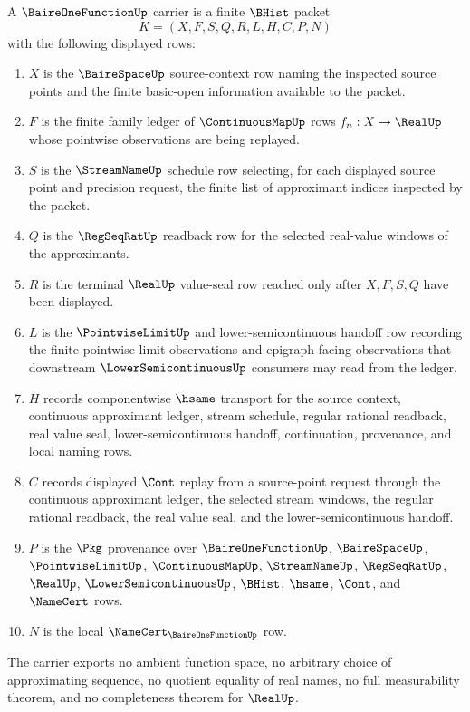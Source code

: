 \begin{definition}
\label{def:baireonefunction-carrier}
\label{def:baire-one-function-carrier}
A $\BaireOneFunctionUp$ carrier is a finite $\BHist$ packet
$$
K=(X,F,S,Q,R,L,H,C,P,N)
$$
with the following displayed rows:
\begin{enumerate}
\item $X$ is the $\BaireSpaceUp$ source-context row naming the inspected source points and the finite basic-open information available to the packet.
\item $F$ is the finite family ledger of $\ContinuousMapUp$ rows $f_n:X\to\RealUp$ whose pointwise observations are being replayed.
\item $S$ is the $\StreamNameUp$ schedule row selecting, for each displayed source point and precision request, the finite list of approximant indices inspected by the packet.
\item $Q$ is the $\RegSeqRatUp$ readback row for the selected real-value windows of the approximants.
\item $R$ is the terminal $\RealUp$ value-seal row reached only after $X,F,S,Q$ have been displayed.
\item $L$ is the $\PointwiseLimitUp$ and lower-semicontinuous handoff row recording the finite pointwise-limit observations and epigraph-facing observations that downstream $\LowerSemicontinuousUp$ consumers may read from the ledger.
\item $H$ records componentwise $\hsame$ transport for the source context, continuous approximant ledger, stream schedule, regular rational readback, real value seal, lower-semicontinuous handoff, continuation, provenance, and local naming rows.
\item $C$ records displayed $\Cont$ replay from a source-point request through the continuous approximant ledger, the selected stream windows, the regular rational readback, the real value seal, and the lower-semicontinuous handoff.
\item $P$ is the $\Pkg$ provenance over $\BaireOneFunctionUp$, $\BaireSpaceUp$, $\PointwiseLimitUp$, $\ContinuousMapUp$, $\StreamNameUp$, $\RegSeqRatUp$, $\RealUp$, $\LowerSemicontinuousUp$, $\BHist$, $\hsame$, $\Cont$, and $\NameCert$ rows.
\item $N$ is the local $\NameCert_{\BaireOneFunctionUp}$ row.
\end{enumerate}
The carrier exports no ambient function space, no arbitrary choice of approximating sequence, no quotient equality of real names, no full measurability theorem, and no completeness theorem for $\RealUp$.
\end{definition}

